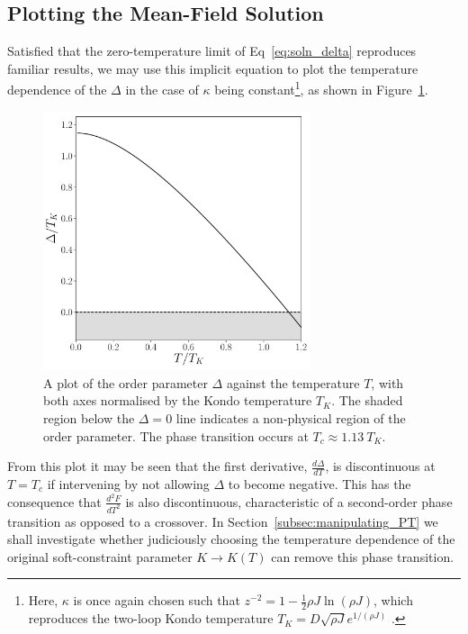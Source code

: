 \documentclass[12pt]{article}
\begin{document}

\subsection{Plotting the Mean-Field Solution}

Satisfied that the zero-temperature limit of Eq~\eqref{eq:soln_delta} reproduces familiar results, we may use this implicit equation to plot the temperature dependence of the $ \Delta $ in the case of $ \kappa $ being constant\footnote{Here, $ \kappa $ is once again chosen such that $ z^{-2} = 1 - \frac{1}{2} \rho J \ln{(\rho J)} $, which reproduces the two-loop Kondo temperature $ T_K = D \sqrt{\rho J} e^{1 / (\rho J)} $ \cite{Draft}.}, as shown in Figure~\ref{fig:delta_vs_T}.

\begin{figure}
\centering
\includegraphics[width=0.7\textwidth]{Figures/delta_vs_T.pdf}
\caption{A plot of the order parameter $ \Delta $ against the temperature $ T $, with both axes normalised by the Kondo temperature $ T_K $. The shaded region below the $ \Delta = 0 $ line indicates a non-physical region of the order parameter. The phase transition occurs at $ T_c \approx 1.13 ~ T_K $.}
\label{fig:delta_vs_T}
\end{figure}

From this plot it may be seen that the first derivative, $ \frac{d \Delta}{d T} $, is discontinuous at $ T = T_c $ if intervening by not allowing $ \Delta $ to become negative. This has the consequence that $ \frac{d^2 F}{d T^2} $ is also discontinuous, characteristic of a second-order phase transition as opposed to a crossover. In Section~\ref{subsec:manipulating_PT} we shall investigate whether judiciously choosing the temperature dependence of the original soft-constraint parameter $ K \rightarrow K(T) $ can remove this phase transition.
\end{document}

